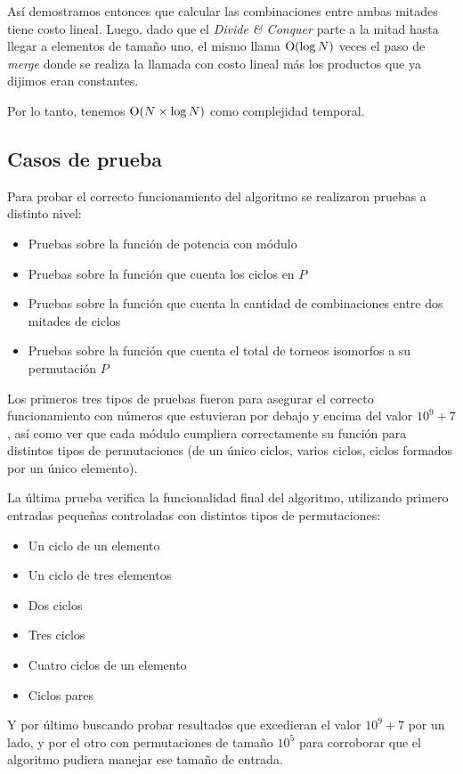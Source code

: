 Así demostramos entonces que calcular las combinaciones entre ambas mitades
tiene costo lineal. Luego, dado que el \emph{Divide \& Conquer} parte a
la mitad hasta llegar a elementos de tamaño uno, el mismo llama $\operatorname{O}(\log{N})$
veces el paso de \emph{merge} donde se realiza la llamada con costo lineal más
los productos que ya dijimos eran constantes.

Por lo tanto, tenemos $\operatorname{O}(N \times \log N)$ como complejidad temporal.

\subsection{Casos de prueba}

Para probar el correcto funcionamiento del algoritmo se realizaron pruebas a
distinto nivel:

\begin{itemize}
    \item Pruebas sobre la función de potencia con módulo
    \item Pruebas sobre la función que cuenta los ciclos en $P$
    \item Pruebas sobre la función que cuenta la cantidad de combinaciones entre
    dos mitades de ciclos
    \item Pruebas sobre la función que cuenta el total de torneos isomorfos a su
    permutación $P$
\end{itemize}

Los primeros tres tipos de pruebas fueron para asegurar el correcto
funcionamiento con números que estuvieran por debajo y encima del valor $10^9 +
7$, así como ver que cada módulo cumpliera correctamente su función para
distintos tipos de permutaciones (de un único ciclos, varios ciclos, ciclos
formados por un único elemento).

La última prueba verifica la funcionalidad final del algoritmo, utilizando primero
entradas pequeñas controladas con distintos tipos de permutaciones:

\begin{itemize}
    \item Un ciclo de un elemento
    \item Un ciclo de tres elementos
    \item Dos ciclos
    \item Tres ciclos
    \item Cuatro ciclos de un elemento
    \item Ciclos pares
\end{itemize}

Y por último buscando probar resultados que excedieran el valor $10^9 +
7$ por un lado, y por el otro con permutaciones de tamaño $10^5$ para corroborar
que el algoritmo pudiera manejar ese tamaño de entrada.
